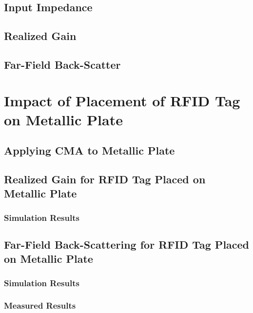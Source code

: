 \documentclass[12pt,onecolumn]{report}
\begin{document}
        \subsection{Input Impedance}
        \subsection{Realized Gain}
        \subsection{Far-Field Back-Scatter}
    \section{Impact of Placement of RFID Tag on Metallic Plate}
        \subsection{Applying CMA to Metallic Plate}
        \subsection{Realized Gain for RFID Tag Placed on Metallic Plate}
            \subsubsection{Simulation Results}
        \subsection{Far-Field Back-Scattering for RFID Tag Placed on Metallic Plate}
            \subsubsection{Simulation Results}
            \subsubsection{Measured Results}
\end{document}
